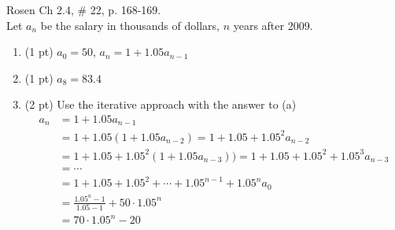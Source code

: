 \documentclass[12pt,addpoints]{exam}
\begin{document}
\begin{questions}
\bonusquestion[4] Rosen Ch 2.4, \# 22, p. 168-169. \\
Let $a_n$ be the salary in thousands of dollars, $n$ years after 2009.
    \ifprintanswers
        \vspace{-10pt}
   \fi
\begin{solution}
\begin{enumerate}[label=(\alph*),topsep=0pt,itemsep=0pt,parsep=0pt]
	\item (1 pt) $a_0 = 50$, $a_n = 1 + 1.05a_{n-1}$ 
	\item (1 pt) $a_8 =  83.4$
	\item (2 pt) Use the iterative approach with the answer to (a) 
	\begin{align*} 
		a_n &= 1 + 1.05a_{n-1} \\
		&= 1 + 1.05(1 + 1.05a_{n-2})  = 1 + 1.05 + 1.05^2a_{n-2}\\
		&= 1 + 1.05 + 1.05^2(1 + 1.05a_{n-3})) = 1 + 1.05 + 1.05^2 + 1.05^3a_{n-3} \\
		&= \cdots \\
		&= 1 + 1.05 + 1.05^2 + \cdots + 1.05^{n-1} + 1.05^na_0 \\
		&= \frac{1.05^n - 1}{1.05 - 1} + 50 \cdot 1.05^n \\
		&= 70 \cdot 1.05^n - 20 
	\end{align*}
\end{enumerate} 
\end{solution}

\end{questions}
\end{document}
